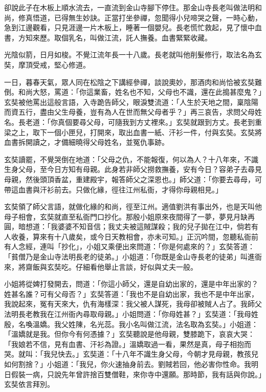 卻說此子在木板上順水流去，一直流到金山寺腳下停住。那金山寺長老叫做法明和尚，修真悟道，已得無生妙訣。正當打坐參禪，忽聞得小兒啼哭之聲，一時心動，急到江邊觀看，只見涯邊一片木板上，睡著一個嬰兒。長老慌忙救起，見了懷中血書，方知來歷。取個乳名，叫做江流，託人撫養。血書緊緊收藏。

光陰似箭，日月如梭。不覺江流年長一十八歲。長老就叫他削髮修行，取法名為玄奘，摩頂受戒，堅心修道。

一日，暮春天氣，眾人同在松陰之下講經參禪，談說奧妙，那酒肉和尚恰被玄奘難倒。和尚大怒，罵道：「你這業畜，姓名也不知，父母也不識，還在此搗甚麼鬼？」玄奘被他罵出這般言語，入寺跪告師父，眼淚雙流道：「人生於天地之間，稟陰陽而資五行，盡由父生母養，豈有為人在世而無父母者乎？」再三哀告，求問父母姓名。長老道：「你真個要尋父母，可隨我到方丈裡來。」玄奘就跟到方丈。長老到重梁之上，取下一個小匣兒，打開來，取出血書一紙、汗衫一件，付與玄奘。玄奘將血書拆開讀之，才備細曉得父母姓名，並冤仇事跡。

玄奘讀罷，不覺哭倒在地道：「父母之仇，不能報復，何以為人？十八年來，不識生身父母，至今日方知有母親。此身若非師父撈救撫養，安有今日？容弟子去尋見母親，然後頭頂香盆，重建殿宇，報答師父之深恩也。」師父道：「你要去尋母，可帶這血書與汗衫前去。只做化緣，徑往江州私衙，才得你母親相見。」

玄奘領了師父言語，就做化緣的和尚，徑至江州。適值劉洪有事出外，也是天叫他母子相會，玄奘就直至私衙門口抄化。那殷小姐原來夜間得了一夢，夢見月缺再圓，暗想道：「我婆婆不知音信；我丈夫被這賊謀殺；我的兒子拋在江中，倘若有人收養，算來有十八歲矣，或今日天教相會，亦未可知。」正沉吟間，忽聽私衙前有人念經，連叫「抄化」，小姐又乘便出來問道：「你是何處來的？」玄奘答道：「貧僧乃是金山寺法明長老的徒弟。」小姐道：「你既是金山寺長老的徒弟」叫進衙來，將齋飯與玄奘吃。仔細看他舉止言談，好似與丈夫一般。

小姐將從婢打發開去，問道：「你這小師父，還是自幼出家的，還是中年出家的？姓甚名誰？可有父母否？」玄奘答道：「我也不是自幼出家，我也不是中年出家，我說起來，冤有天來大，仇有海樣深：我父被人謀死，我母卻被賊人占了。我師父法明長老教我在江州衙內尋取母親。」小姐問道：「你母姓甚？」玄奘道：「我母姓殷，名喚溫嬌。我父姓陳，名光蕊。我小名叫做江流，法名取為玄奘。」小姐道：「溫嬌就是我。但你今有何憑據？」玄奘聽說是他母親，雙膝跪下，哀哀大哭：「我娘若不信，見有血書、汗衫為證。」溫嬌取過一看，果然是真，母子相抱而哭。就叫：「我兒快去。」玄奘道：「十八年不識生身父母，今朝才見母親，教孩兒如何割捨？」小姐道：「我兒，你火速抽身前去。劉賊若回，他必害你性命。我明日假裝一病，只說先年曾許捨百雙僧鞋，來你寺中還願。那時節，我有話與你說。」玄奘依言拜別。

